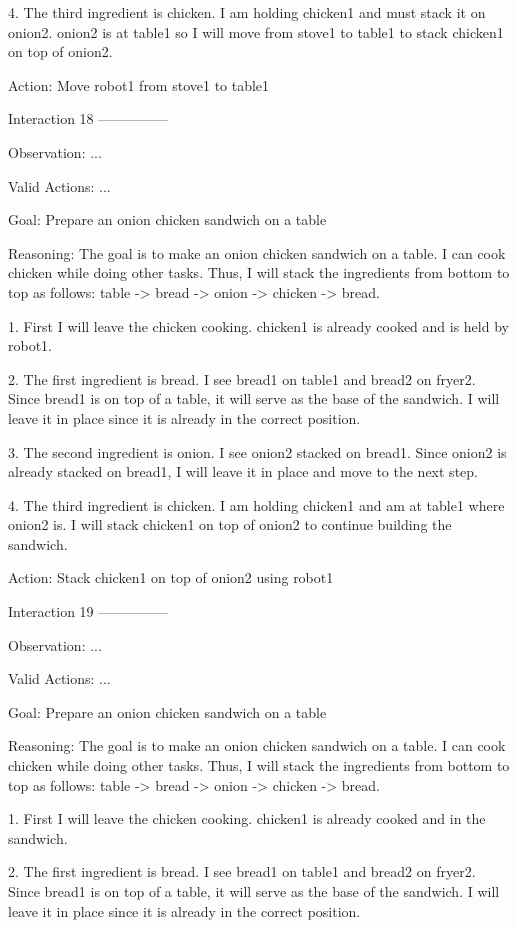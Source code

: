 4. The third ingredient is chicken. I am holding chicken1 and must stack it on onion2. onion2 is at table1 so I will move from stove1 to table1 to stack chicken1 on top of onion2.

Action: Move robot1 from stove1 to table1


Interaction 18
---------------


Observation: ...

Valid Actions: ...

Goal: Prepare an onion chicken sandwich on a table


Reasoning: The goal is to make an onion chicken sandwich on a table. I can cook chicken while doing other tasks. Thus, I
will stack the ingredients from bottom to top as follows: table -> bread -> onion -> chicken -> bread.

1. First I will leave the chicken cooking. chicken1 is already cooked and is held by robot1.

2. The first ingredient is bread. I see bread1 on table1 and bread2 on fryer2. Since bread1 is on top of a table, it will serve as the base of the sandwich. I will leave it in place since it is already in the correct position.

3. The second ingredient is onion. I see onion2 stacked on bread1. Since onion2 is already stacked on bread1, I will leave it in place and move to the next step.

4. The third ingredient is chicken. I am holding chicken1 and am at table1 where onion2 is. I will stack chicken1 on top of onion2 to continue building the sandwich.

Action: Stack chicken1 on top of onion2 using robot1


Interaction 19
---------------


Observation: ...

Valid Actions: ...

Goal: Prepare an onion chicken sandwich on a table


Reasoning: The goal is to make an onion chicken sandwich on a table. I can cook chicken while doing other tasks. Thus, I
will stack the ingredients from bottom to top as follows: table -> bread -> onion -> chicken -> bread.

1. First I will leave the chicken cooking. chicken1 is already cooked and in the sandwich.

2. The first ingredient is bread. I see bread1 on table1 and bread2 on fryer2. Since bread1 is on top of a table, it will serve as the base of the sandwich. I will leave it in place since it is already in the correct position.

